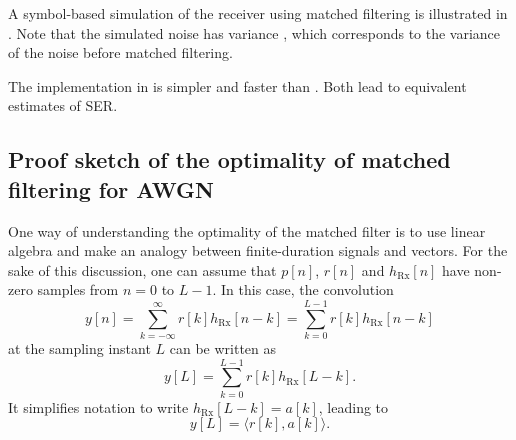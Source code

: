 A symbol-based simulation of the receiver using matched filtering is illustrated in . Note that the simulated noise  has variance , which corresponds to the variance  of the noise before matched filtering.


The implementation in  is simpler and faster than . Both lead to equivalent estimates of SER.
\eExample 



\subsection{Proof sketch of the optimality of matched filtering for AWGN}
\label{sec:MFOptimalityProofSketch}

One way of understanding the optimality of the matched filter is to use linear algebra and make an analogy between finite-duration signals and vectors.
For the sake of this discussion, one can assume that $p[n]$, $r[n]$ and $h_\textrm{Rx}[n]$ have non-zero samples from $n=0$ to $L-1$. In this case, the convolution
\[y[n]=\sum_{k=-\infty}^\infty r[k] h_\textrm{Rx}[n-k] = \sum_{k=0}^{L-1} r[k] h_\textrm{Rx}[n-k]\]
at the sampling instant $L$ can be written as
\begin{equation}
y[L]= \sum_{k=0}^{L-1} r[k] h_\textrm{Rx}[L-k].
\label{eq:mfout}
\end{equation}
It simplifies notation to write $h_\textrm{Rx}[L-k] = a[k]$, leading to
\[
y[L]= \langle r[k],a[k]\rangle.
\]

